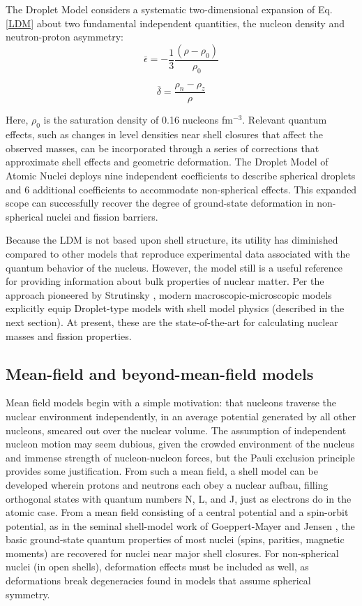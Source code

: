 The Droplet Model \cite{MyersAndSwiatecki} considers a systematic two-dimensional expansion of
Eq. \ref{LDM} about two fundamental independent quantities, the nucleon density
and neutron-proton asymmetry:
\begin{equation} \label{DropletIndependentQuantities}
    \bar{\epsilon} = -\frac{1}{3}\frac{(\rho - \rho_{0})}{\rho_{0}}
\end{equation}

\begin{equation}
    \bar{\delta} = \frac{\rho_{n}-\rho_{z}}{\rho}
\end{equation}

\noindent
Here, $\rho_{0}$ is the saturation density of 0.16 nucleons fm$^{-3}$. Relevant quantum
effects, such as changes in level densities near shell closures
that affect the observed masses, can be incorporated through a series of corrections
that approximate shell effects and geometric deformation.
The Droplet Model of Atomic Nuclei deploys nine 
independent coefficients to describe spherical droplets and 6 additional
coefficients to accommodate non-spherical effects. This expanded scope
can successfully recover the degree of ground-state deformation in non-spherical
nuclei and fission barriers.

Because the LDM is not based upon shell structure, its utility has diminished
compared to other models that reproduce experimental data associated with the quantum
behavior of the nucleus. However, the model still is a useful reference for providing 
information about bulk properties of nuclear matter. Per the approach pioneered by Strutinsky \cite{Strutinsky1967, Seeger1975},
modern macroscopic-microscopic models \cite{Moller1988, Wang2015} explicitly equip Droplet-type models
with shell model physics (described in the next section). At present, these are the state-of-the-art
for calculating nuclear masses and fission properties.

\subsection{Mean-field and beyond-mean-field models}
Mean field models begin with a simple motivation: that nucleons
traverse the nuclear environment independently, in an average
potential generated by all other nucleons, smeared out over the nuclear volume.
The assumption of independent nucleon motion may seem dubious, given the
crowded environment of the nucleus and immense strength of nucleon-nucleon forces,
but the Pauli exclusion principle provides some justification.
From such a mean field, a shell model can be developed wherein protons and neutrons each
obey a nuclear aufbau, filling orthogonal states with quantum numbers N, L, and J, just as electrons do in the atomic 
case. From a mean field consisting of a central
potential and a spin-orbit potential, as in the seminal shell-model work of Goeppert-Mayer
and Jensen \cite{GoeppertMayer1955}, the basic ground-state quantum properties of most nuclei
(spins, parities, magnetic moments) are recovered for nuclei near major shell closures. For non-spherical nuclei (in open shells),
deformation effects must be included as well, as deformations break degeneracies
found in models that assume spherical symmetry.

